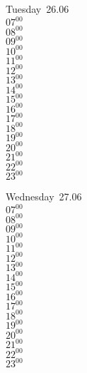 \documentclass[11pt, a4paper]{book}\usepackage[]{graphicx}\usepackage[]{color}
\begin{document}
\begin{weekdaybox}
  Tuesday~26.06\\
  { 
  \vfill
  $07^{00}$\\
$08^{00}$\\
$09^{00}$\\
$10^{00}$\\
$11^{00}$\\
$12^{00}$\\
$13^{00}$\\
$14^{00}$\\
$15^{00}$\\
$16^{00}$\\
$17^{00}$\\
$18^{00}$\\
$19^{00}$\\
$20^{00}$\\
$21^{00}$\\
$22^{00}$\\
$23^{00}$\\
  }
\end{weekdaybox}
\begin{weekdaybox}
  Wednesday~27.06\\
  { 
  \vfill
  $07^{00}$\\
$08^{00}$\\
$09^{00}$\\
$10^{00}$\\
$11^{00}$\\
$12^{00}$\\
$13^{00}$\\
$14^{00}$\\
$15^{00}$\\
$16^{00}$\\
$17^{00}$\\
$18^{00}$\\
$19^{00}$\\
$20^{00}$\\
$21^{00}$\\
$22^{00}$\\
$23^{00}$\\
  }
\end{weekdaybox}
\clearpage
\begin{headerbox}
\end{headerbox}
\end{document}
